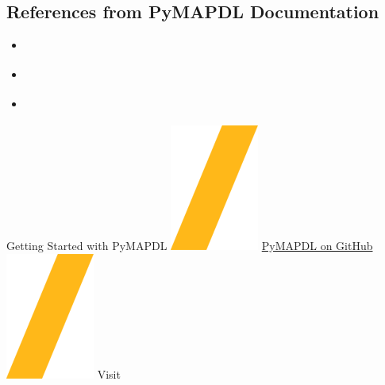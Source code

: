 \documentclass[9pt,landscape]{article}
\begin{document}
\begin{multicols}{3}
\subsection{References from PyMAPDL Documentation}
\begin{itemize}
\item \href{https://mapdl.docs.pyansys.com/version/stable/getting_started/index.html}{\color{blue}{Getting Started}}
\item \href{https://mapdl.docs.pyansys.com/version/stable/mapdl_commands/index.html}{\color{blue}{MAPDL Commands}}
\item \href{https://mapdl.docs.pyansys.com/version/stable/api/index.html}{\color{blue}{API Reference}}
\end{itemize}
\end{multicols}
\vspace{-0.15cm}
\noindent\makebox[\linewidth]{\rule{\paperwidth}{4pt}}
\begin{center}
Getting Started with PyMAPDL \includegraphics[height=\fontcharht\font`\S]{slash.png} \href{https://github.com/pyansys/pymapdl}{{\color{blue}PyMAPDL on GitHub}} \includegraphics[height=\fontcharht\font`\S]{slash.png} Visit 
\end{center}
\end{document}
